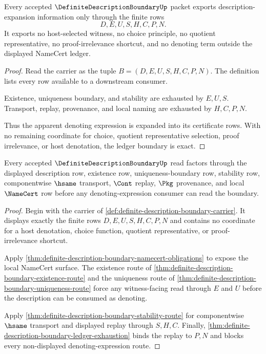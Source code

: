 \begin{theorem}
\label{thm:definite-description-boundary-ledger-exhaustion}
Every accepted $\DefiniteDescriptionBoundaryUp$ packet exports description-expansion information only through the finite rows
$$
D,E,U,S,H,C,P,N.
$$
It exports no host-selected witness, no choice principle, no quotient representative, no proof-irrelevance shortcut, and no denoting term outside the displayed NameCert ledger.
\end{theorem}
\begin{proof}
Read the carrier as the tuple $B=(D,E,U,S,H,C,P,N)$. The definition lists every row available to a downstream consumer.

Existence, uniqueness boundary, and stability are exhausted by $E,U,S$. Transport, replay, provenance, and local naming are exhausted by $H,C,P,N$.

Thus the apparent denoting expression is expanded into its certificate rows. With no remaining coordinate for choice, quotient representative selection, proof irrelevance, or host denotation, the ledger boundary is exact.
\end{proof}

\begin{theorem}
\label{thm:definite-description-boundary-scoped-kernel-route}
Every accepted $\DefiniteDescriptionBoundaryUp$ read factors through the displayed description row, existence row, uniqueness-boundary row, stability row, componentwise $\hsame$ transport, $\Cont$ replay, $\Pkg$ provenance, and local $\NameCert$ row before any denoting-expression consumer can read the boundary.
\end{theorem}
\begin{proof}
Begin with the carrier of \autoref{def:definite-description-boundary-carrier}. It displays exactly the finite rows $D,E,U,S,H,C,P,N$ and contains no coordinate for a host denotation, choice function, quotient representative, or proof-irrelevance shortcut.

Apply \autoref{thm:definite-description-boundary-namecert-obligations} to expose the local NameCert surface. The existence route of \autoref{thm:definite-description-boundary-existence-route} and the uniqueness route of \autoref{thm:definite-description-boundary-uniqueness-route} force any witness-facing read through $E$ and $U$ before the description can be consumed as denoting.

Apply \autoref{thm:definite-description-boundary-stability-route} for componentwise $\hsame$ transport and displayed replay through $S,H,C$. Finally, \autoref{thm:definite-description-boundary-ledger-exhaustion} binds the replay to $P,N$ and blocks every non-displayed denoting-expression route.
\end{proof}

